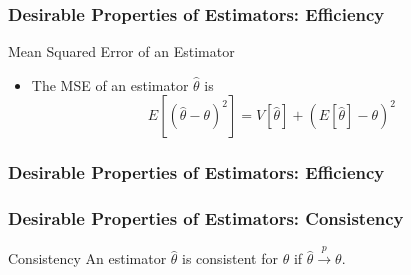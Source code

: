 \documentclass[12pt, block=fill]{beamer}
\begin{document}
\begin{frame}[t]
  \frametitle{Desirable Properties of Estimators: Efficiency}
  \begin{block}{Mean Squared Error of an Estimator}
    \begin{itemize}
    \item The MSE of an estimator  $\hat{\theta}$ is
      \[
        E[(\hat{\theta} - \theta)^{2}] = V[\hat{\theta}] +
        (E[\hat{\theta}] - \theta)^{2}
      \]
    \end{itemize}
  \end{block}
\end{frame}

\begin{frame}
  \frametitle{Desirable Properties of Estimators: Efficiency}
  
\end{frame}

\begin{frame}[t]
  \frametitle{Desirable Properties of Estimators: Consistency}
  \begin{block}{Consistency}
    An estimator $\hat{\theta}$ is consistent for $\theta$ if
    $\hat{\theta}\overset{p}{\to}\theta$.
  \end{block}
\end{frame}
\end{document}
